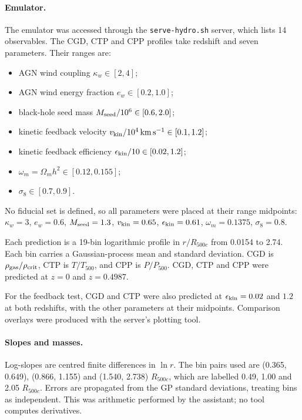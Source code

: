 \documentclass[11pt,a4paper]{article}
\begin{document}
\paragraph{Emulator.}
The emulator was accessed through the \texttt{serve-hydro.sh} server, which lists 14 observables. The CGD, CTP and CPP profiles take redshift and seven parameters. Their ranges are:
\begin{itemize}
\item AGN wind coupling $\kappa_w\in[2,4]$;
\item AGN wind energy fraction $e_w\in[0.2,1.0]$;
\item black-hole seed mass $M_{\rm seed}/10^6\in[0.6,2.0]$;
\item kinetic feedback velocity $v_{\rm kin}/10^4\,\mathrm{km\,s^{-1}}\in[0.1,1.2]$;
\item kinetic feedback efficiency $\epsilon_{\rm kin}/10\in[0.02,1.2]$;
\item $\omega_m=\Omega_m h^2\in[0.12,0.155]$;
\item $\sigma_8\in[0.7,0.9]$.
\end{itemize}

No fiducial set is defined, so all parameters were placed at their range midpoints: $\kappa_w=3$, $e_w=0.6$, $M_{\rm seed}=1.3$, $v_{\rm kin}=0.65$, $\epsilon_{\rm kin}=0.61$, $\omega_m=0.1375$, $\sigma_8=0.8$.

Each prediction is a 19-bin logarithmic profile in $r/R_{500c}$ from 0.0154 to 2.74. Each bin carries a Gaussian-process mean and standard deviation. CGD is $\rho_{\rm gas}/\rho_{\rm crit}$, CTP is $T/T_{500}$, and CPP is $P/P_{500}$. CGD, CTP and CPP were predicted at $z=0$ and $z=0.4987$.

For the feedback test, CGD and CTP were also predicted at $\epsilon_{\rm kin}=0.02$ and $1.2$ at both redshifts, with the other parameters at their midpoints. Comparison overlays were produced with the server's plotting tool.

\paragraph{Slopes and masses.}
Log-slopes are centred finite differences in $\ln r$. The bin pairs used are (0.365, 0.649), (0.866, 1.155) and (1.540, 2.738) $R_{500c}$, which are labelled 0.49, 1.00 and 2.05 $R_{500c}$. Errors are propagated from the GP standard deviations, treating bins as independent. This was arithmetic performed by the assistant; no tool computes derivatives.
\end{document}
